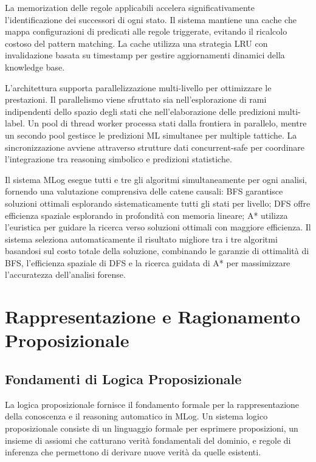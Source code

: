 \documentclass[12pt,a4paper]{report}
\theoremstyle{definition}
\begin{document}
La memorization delle regole applicabili accelera significativamente l'identificazione dei successori di ogni stato. Il sistema mantiene una cache che mappa configurazioni di predicati alle regole triggerate, evitando il ricalcolo costoso del pattern matching. La cache utilizza una strategia LRU con invalidazione basata su timestamp per gestire aggiornamenti dinamici della knowledge base.

L'architettura supporta parallelizzazione multi-livello per ottimizzare le prestazioni. Il parallelismo viene sfruttato sia nell'esplorazione di rami indipendenti dello spazio degli stati che nell'elaborazione delle predizioni multi-label. Un pool di thread worker processa stati dalla frontiera in parallelo, mentre un secondo pool gestisce le predizioni ML simultanee per multiple tattiche. La sincronizzazione avviene attraverso strutture dati concurrent-safe per coordinare l'integrazione tra reasoning simbolico e predizioni statistiche.

Il sistema MLog esegue tutti e tre gli algoritmi simultaneamente per ogni analisi, fornendo una valutazione comprensiva delle catene causali: BFS garantisce soluzioni ottimali esplorando sistematicamente tutti gli stati per livello; DFS offre efficienza spaziale esplorando in profondità con memoria lineare; A* utilizza l'euristica per guidare la ricerca verso soluzioni ottimali con maggiore efficienza. Il sistema seleziona automaticamente il risultato migliore tra i tre algoritmi basandosi sul costo totale della soluzione, combinando le garanzie di ottimalità di BFS, l'efficienza spaziale di DFS e la ricerca guidata di A* per massimizzare l'accuratezza dell'analisi forense.

\chapter{Rappresentazione e Ragionamento Proposizionale}

\section{Fondamenti di Logica Proposizionale}

La logica proposizionale fornisce il fondamento formale per la rappresentazione della conoscenza e il reasoning automatico in MLog. Un sistema logico proposizionale consiste di un linguaggio formale per esprimere proposizioni, un insieme di assiomi che catturano verità fondamentali del dominio, e regole di inferenza che permettono di derivare nuove verità da quelle esistenti.
\end{document}
